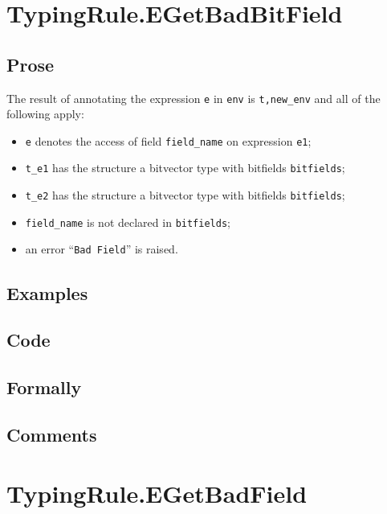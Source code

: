 \documentclass{book}
\begin{document}
\section{TypingRule.EGetBadBitField \label{sec:TypingRule.EGetBadBitField}}

  \subsection{Prose}
  The result of annotating the expression \texttt{e} in \texttt{env} is
\texttt{t,new\_env} and all of the following apply:
  \begin{itemize}
  \item \texttt{e} denotes the access of field \texttt{field\_name} on expression \texttt{e1};
  \item \texttt{t\_e1} has the structure a bitvector type with bitfields \texttt{bitfields};
  \item \texttt{t\_e2} has the structure a bitvector type with bitfields \texttt{bitfields};
  \item \texttt{field\_name} is not declared in \texttt{bitfields};
  \item an error ``\texttt{Bad Field}'' is raised.
  \end{itemize}

  \subsection{Examples}

  \subsection{Code}

  \subsection{Formally}

  \subsection{Comments}

\section{TypingRule.EGetBadField \label{sec:TypingRule.EGetBadField}}
\end{document}
